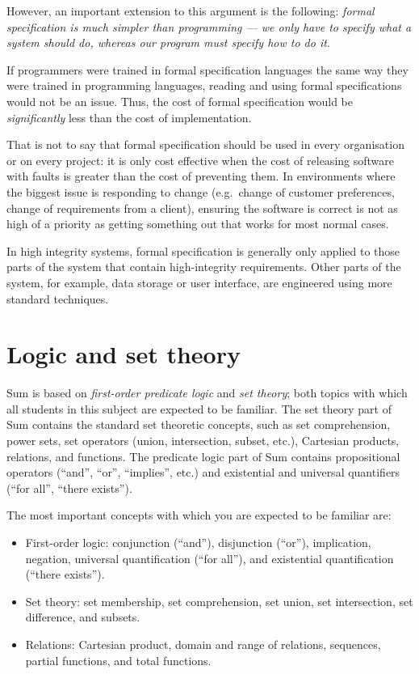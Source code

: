 However, an important extension to this argument is the following: \emph{formal specification is much simpler than programming --- we only have to specify \emph{what} a system should do, whereas our program must specify \emph{how} to do it}.

If programmers were trained in formal specification languages the same way they were trained in programming languages, reading and using formal specifications would not be an issue. Thus, the cost of formal specification would be \emph{significantly} less than the cost of implementation.

That is not to say that formal specification should be used in every organisation or on every project: it is only cost effective when the cost of releasing software with faults is greater than the cost of preventing them. In environments where the biggest issue is responding to change (e.g.\ change of customer preferences, change of requirements from a client), ensuring the software is correct is not as high of a priority as getting something out that works for most normal cases.

In high integrity systems, formal specification is generally only applied to those parts of the system that contain high-integrity requirements. Other parts of the system, for example, data storage or user interface, are engineered using more standard techniques.

\section{Logic and set theory}

Sum is based on \emph{first-order predicate logic} and \emph{set theory}; both topics with which all students in this subject are expected to be familiar. 
The set theory part of Sum contains the standard set theoretic concepts, such as set comprehension, power sets, set operators (union, intersection, subset, etc.), Cartesian products, relations, and functions. The predicate logic part of Sum contains propositional operators (``and'', ``or'', ``implies'', etc.) and existential and universal quantifiers (``for all'', ``there exists'').

The most important concepts with which you are expected to be familiar are:

\begin{itemize}

 \item First-order logic: conjunction (``and''), disjunction (``or''), implication, negation, universal quantification (``for all''), and existential quantification (``there exists'').

 \item Set theory: set membership, set comprehension, set union, set intersection, set difference, and subsets.

 \item Relations: Cartesian product, domain and range of relations, sequences, partial functions, and total functions.

\end{itemize}

